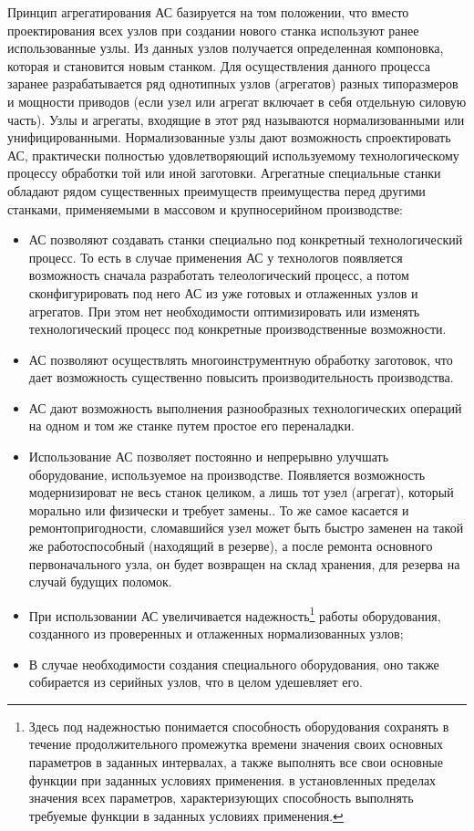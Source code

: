 Принцип агрегатирования АС базируется на том положении, что вместо проектирования всех узлов при создании нового станка используют ранее использованные узлы. Из данных узлов получается определенная компоновка, которая и становится новым станком. Для осуществления данного процесса заранее разрабатывается ряд однотипных узлов (агрегатов) разных типоразмеров и мощности приводов (если узел или агрегат включает в себя отдельную силовую часть). Узлы и агрегаты, входящие в этот ряд называются нормализованными или унифицированными. Нормализованные узлы дают возможность спроектировать АС, практически полностью удовлетворяющий используемому технологическому процессу обработки той или иной заготовки. Агрегатные специальные станки обладают рядом существенных преимуществ преимущества перед другими станками, применяемыми в массовом и крупносерийном производстве:

\begin{itemize}
	\item АС позволяют создавать станки специально под конкретный технологический процесс. То есть в случае применения АС у технологов появляется возможность сначала разработать телеологический процесс, а потом сконфигурировать под него АС из уже готовых и отлаженных узлов и агрегатов. При этом нет необходимости оптимизировать или изменять технологический процесс под конкретные производственные возможности.
	\item АС позволяют осуществлять многоинструментную обработку заготовок, что дает возможность существенно повысить производительность производства.
	\item АС дают возможность выполнения разнообразных технологических операций на одном и том же станке путем простое его переналадки.
	\item Использование АС позволяет постоянно и непрерывно улучшать оборудование, используемое на производстве. Появляется возможность модернизироват не весь станок целиком, а лишь тот узел (агрегат), который морально или физически и требует замены.. То же самое касается и ремонтопригодности, сломавшийся узел может быть быстро заменен на такой же работоспособный (находящий в резерве), а после ремонта основного первоначального узла, он будет возвращен на склад хранения, для резерва на случай будущих поломок.
	\item При использовании АС увеличивается надежность\footnote{Здесь под надежностью понимается способность оборудования сохранять в течение продолжительного промежутка времени значения своих основных параметров в заданных интервалах, а также выполнять все свои основные функции при заданных условиях применения. в установленных пределах значения всех параметров, характеризующих способность выполнять требуемые функции в заданных условиях применения.} работы оборудования, созданного из проверенных и отлаженных нормализованных узлов;
	\item В случае необходимости создания специального оборудования, оно также собирается из серийных узлов, что в целом удешевляет его.
\end{itemize}

